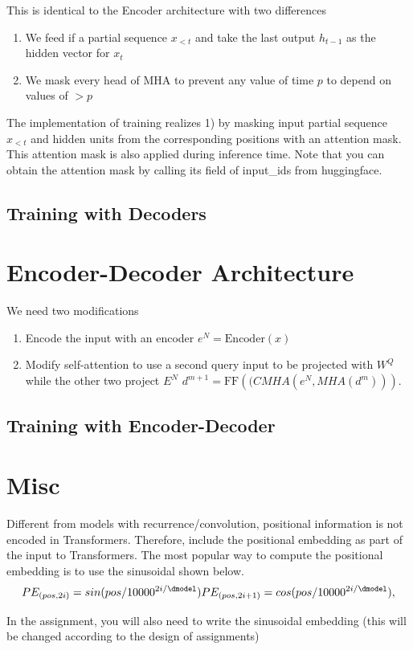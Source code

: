 This is identical to the Encoder architecture with two differences

\begin{enumerate}
    \item We feed if a partial sequence $x_{<t}$ and take the last output $h_{t-1}$ as the hidden vector for $x_t$
    \item We mask every head of $\mathrm{MHA}$ to prevent any value of time $p$ to depend on values of $>p$
\end{enumerate}

The implementation of training realizes 1) by masking input partial sequence $x_{<t}$ and hidden units from the corresponding positions with an attention mask. This attention mask is also applied during inference time. Note that you can obtain the attention mask by calling its field of input\_ids from huggingface.

\subsection{Training with Decoders}

\section{Encoder-Decoder Architecture}

We need two modifications
\begin{enumerate}
    \item Encode the input with an encoder $e^N = \mathrm{Encoder}(x)$
    \item Modify self-attention to use a second query input to be projected with $W^Q$ while the other two project $E^N$ $d^{m+1} = \mathrm{FF}(\mathrm(CMHA(e^N, MHA(d^m))).$
\end{enumerate}

\subsection{Training with Encoder-Decoder}

\section{Misc}
Different from models with recurrence/convolution, positional information is not encoded in Transformers. Therefore, \citet{vaswani2017attention} include the positional embedding as part of the input to Transformers. The most popular way to compute the positional embedding is to use the sinusoidal shown below.
\begin{equation*}
        PE_{(pos,2i)} = sin(pos / 10000^{2i/\dmodel}) \\
        PE_{(pos,2i+1)} = cos(pos / 10000^{2i/\dmodel}),
\end{equation*}

In the assignment, you will also need to write the sinusoidal embedding (this will be changed according to the design of assignments)


\begin{enumerate}
\end{enumerate}

